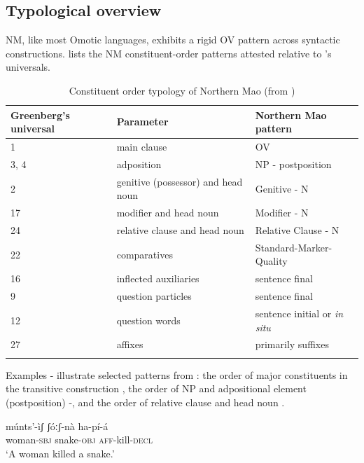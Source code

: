 \documentclass[output=paper]{langsci/langscibook}
\begin{document}
\subsection{Typological overview}\label{sec:mahland:1.1}

NM, like most Omotic languages, exhibits a rigid OV pattern across syntactic constructions.  lists the NM constituent-order patterns attested relative to \cite{Greenberg1963}'s universals. 

\begin{table}
\caption{Constituent order typology of Northern Mao (from \citealt[48]{Ahland2012})}
\label{tab:mahland:1}
  	\centering
\begin{tabularx}{\textwidth}{XXX}
\lsptoprule
Greenberg's universal & Parameter & Northern Mao pattern\\
\midrule
1 & main clause & OV\\
3, 4 & adposition & NP - postposition \\
2 & genitive (possessor) and head noun & Genitive - N\\
17 & modifier and head noun & Modifier - N\\
24 & \mdseries relative clause\index{subordination!relative clauses} and head noun & Relative Clause - N\\
22 & comparatives & Standard-Marker-Quality\\
16 & inflected auxiliaries & sentence final\\
9 & question particles & sentence final\\
12 & question words & sentence initial or \textit{in situ}\\
27 & affixes & primarily suffixes\\
\lspbottomrule
\end{tabularx}
\end{table}

Examples - illustrate selected patterns from : the order of major constituents in the transitive construction , the order of NP and adpositional element (postposition) -, and the order of relative clause and head noun . 

\ea\label{ex:mahland:1}
\gll  múnts'-ìʃ       ʃóːʃ-nà          ha-pí-{\downstep}á \\
woman\textsc{{}-sbj}    snake\textsc{{}-obj}     \textsc{aff}-kill\textsc{{}-decl} \\
\glt `A woman killed a snake.'
\z        
\end{document}
